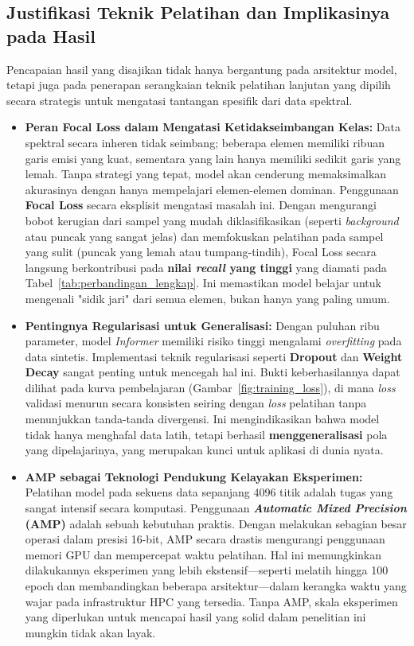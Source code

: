 \subsection{Justifikasi Teknik Pelatihan dan Implikasinya pada Hasil}
\par Pencapaian hasil yang disajikan tidak hanya bergantung pada arsitektur model, tetapi juga pada penerapan serangkaian teknik pelatihan lanjutan yang dipilih secara strategis untuk mengatasi tantangan spesifik dari data spektral.
\begin{itemize}
        \item \textbf{Peran Focal Loss dalam Mengatasi Ketidakseimbangan Kelas:} Data spektral secara inheren tidak seimbang; beberapa elemen memiliki ribuan garis emisi yang kuat, sementara yang lain hanya memiliki sedikit garis yang lemah. Tanpa strategi yang tepat, model akan cenderung memaksimalkan akurasinya dengan hanya mempelajari elemen-elemen dominan. Penggunaan \textbf{Focal Loss} secara eksplisit mengatasi masalah ini. Dengan mengurangi bobot kerugian dari sampel yang mudah diklasifikasikan (seperti \textit{background} atau puncak yang sangat jelas) dan memfokuskan pelatihan pada sampel yang sulit (puncak yang lemah atau tumpang-tindih), Focal Loss secara langsung berkontribusi pada \textbf{nilai \textit{recall} yang tinggi} yang diamati pada Tabel~\ref{tab:perbandingan_lengkap}. Ini memastikan model belajar untuk mengenali "sidik jari" dari semua elemen, bukan hanya yang paling umum.   
        \item \textbf{Pentingnya Regularisasi untuk Generalisasi:} Dengan puluhan ribu parameter, model \textit{Informer} memiliki risiko tinggi mengalami \textit{overfitting} pada data sintetis. Implementasi teknik regularisasi seperti \textbf{Dropout} dan \textbf{Weight Decay} sangat penting untuk mencegah hal ini. Bukti keberhasilannya dapat dilihat pada kurva pembelajaran (Gambar~\ref{fig:training_loss}), di mana \textit{loss} validasi menurun secara konsisten seiring dengan \textit{loss} pelatihan tanpa menunjukkan tanda-tanda divergensi. Ini mengindikasikan bahwa model tidak hanya menghafal data latih, tetapi berhasil \textbf{menggeneralisasi} pola yang dipelajarinya, yang merupakan kunci untuk aplikasi di dunia nyata.
        \item \textbf{AMP sebagai Teknologi Pendukung Kelayakan Eksperimen:} Pelatihan model pada sekuens data sepanjang 4096 titik adalah tugas yang sangat intensif secara komputasi. Penggunaan \textbf{\textit{Automatic Mixed Precision} (AMP)} adalah sebuah kebutuhan praktis. Dengan melakukan sebagian besar operasi dalam presisi 16-bit, AMP secara drastis mengurangi penggunaan memori GPU dan mempercepat waktu pelatihan. Hal ini memungkinkan dilakukannya eksperimen yang lebih ekstensif—seperti melatih hingga 100 epoch dan membandingkan beberapa arsitektur—dalam kerangka waktu yang wajar pada infrastruktur HPC yang tersedia. Tanpa AMP, skala eksperimen yang diperlukan untuk mencapai hasil yang solid dalam penelitian ini mungkin tidak akan layak.
\end{itemize}

